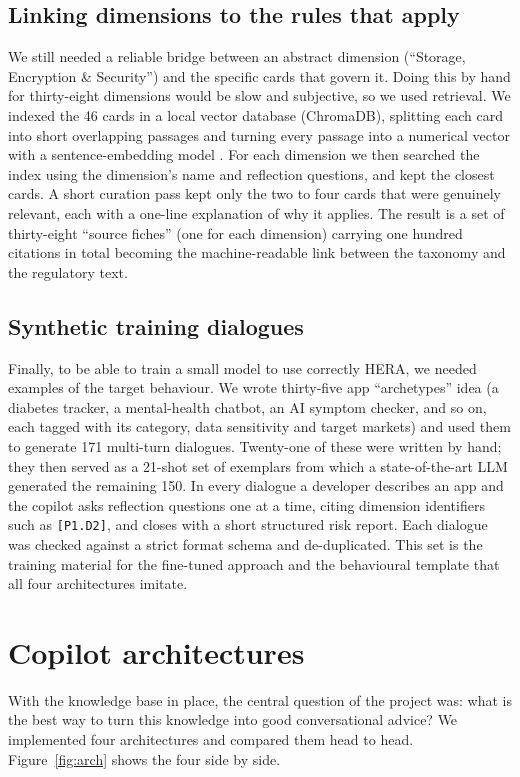 \documentclass[11pt]{article}
\begin{document}
\subsection{Linking dimensions to the rules that apply}
We still needed a reliable bridge between an abstract dimension (``Storage, Encryption \&
Security'') and the specific cards that govern it. Doing this by hand for thirty-eight
dimensions would be slow and subjective, so we used retrieval. We indexed the 46
cards in a local vector database (ChromaDB), splitting each card into short overlapping
passages and turning every passage into a numerical vector with a sentence-embedding
model \citep{reimers2019sentencebert,xiao2024cpack}. For each dimension we then searched
the index using the dimension's name and reflection questions, and kept the closest
cards. A short curation pass kept only the two to four cards that were genuinely
relevant, each with a one-line explanation of why it applies. The result is a set
of thirty-eight ``source fiches'' (one for each dimension) carrying one hundred citations in total becoming the
machine-readable link between the taxonomy and the regulatory text.
\subsection{Synthetic training dialogues}
Finally, to be able to train a small model to use correctly HERA, we needed
examples of the target behaviour. We wrote thirty-five app ``archetypes'' idea (a diabetes
tracker, a mental-health chatbot, an AI symptom checker, and so on, each tagged with its
category, data sensitivity and target markets) and used them to generate
171 multi-turn dialogues. Twenty-one of these were written by hand; they then served as a 21-shot set
of exemplars from which a state-of-the-art LLM generated the remaining 150. In every dialogue a developer describes an app and the
copilot asks reflection questions one at a time, citing dimension identifiers such as
\texttt{[P1.D2]}, and closes with a short structured risk report. Each dialogue was
checked against a strict format schema and de-duplicated. This set is the training
material for the fine-tuned approach and the behavioural template that all four
architectures imitate.
\section{Copilot architectures}
\label{sec:arch}
With the knowledge base in place, the central question of the project was: what is
the best way to turn this knowledge into good conversational advice? We implemented four
architectures and compared them head to head. Figure~\ref{fig:arch} shows the four side
by side.
\end{document}
